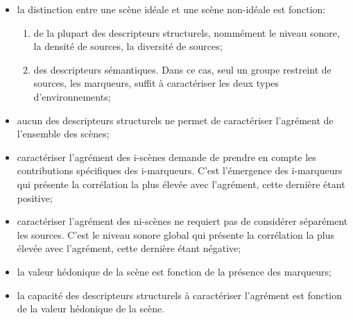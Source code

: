 \begin{itemize}
\item la distinction entre une scène idéale et une scène non-idéale est fonction:

\begin{enumerate}
\item de la plupart des descripteurs structurels, nommément le niveau sonore, la densité de sources, la diversité de sources;
\item des descripteurs sémantiques. Dans ce cas, seul un groupe restreint de sources, les marqueurs, suffit à caractériser les deux types d'environnements;
\end{enumerate}

\item aucun des descripteurs structurels ne permet de caractériser l'agrément de l'ensemble des scènes;

\item caractériser l'agrément des i-scènes demande de prendre en compte les contributions spécifiques des i-marqueurs. C'est l'émergence des i-marqueurs qui présente la corrélation la plus élevée avec l'agrément, cette dernière étant positive;

\item caractériser l'agrément des ni-scènes ne requiert pas de considérer séparément les sources. C'est le niveau sonore global qui présente la corrélation la plus élevée avec l'agrément, cette dernière étant négative;

\item la valeur hédonique de la scène est fonction de la présence des marqueurs;

\item la capacité des descripteurs structurels à caractériser l'agrément est fonction de la valeur hédonique de la scène.

\end{itemize}



